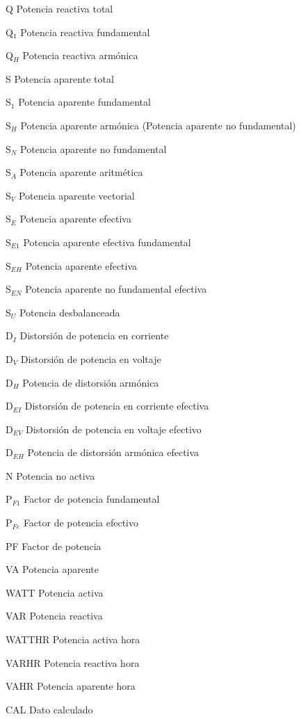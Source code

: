 \begin{abbrv}
\item[Q]		Potencia reactiva total
\item[Q$_{1}$]		Potencia reactiva fundamental
\item[Q$_{H}$]		Potencia reactiva armónica

\item[S]			Potencia aparente total
\item[S$_{1}$]		Potencia aparente fundamental
\item[S$_{H}$]		Potencia aparente armónica (Potencia aparente no fundamental)

\item[S$_{N}$]		Potencia aparente no fundamental
\item[S$_{A}$]      Potencia aparente aritmética
\item[S$_{V}$]      Potencia aparente vectorial
\item[S$_{E}$]      Potencia aparente efectiva
\item[S$_{E1}$]      Potencia aparente efectiva fundamental
\item[S$_{EH}$]      Potencia aparente efectiva 
\item[S$_{EN}$]      Potencia aparente no fundamental efectiva
\item[S$_{U}$]      Potencia desbalanceada
\item[D$_{I}$]		Distorsión de potencia en corriente
\item[D$_{V}$]		Distorsión de potencia en voltaje
\item[D$_{H}$]		Potencia de distorsión armónica
\item[D$_{EI}$]		Distorsión de potencia en corriente efectiva
\item[D$_{EV}$]		Distorsión de potencia en voltaje efectivo
\item[D$_{EH}$]		Potencia de distorsión armónica efectiva

\item[N]			Potencia no activa

\item[P$_{F1}$]		Factor de potencia fundamental
\item[P$_{Fe}$]		Factor de potencia efectivo
\item[PF]			Factor de potencia
\item[VA]           Potencia aparente
\item[WATT]         Potencia activa
\item[VAR]          Potencia reactiva   
\item[WATTHR]       Potencia activa hora
\item[VARHR]        Potencia reactiva hora
\item[VAHR]         Potencia aparente hora
\item[CAL]          Dato calculado

\end{abbrv}


